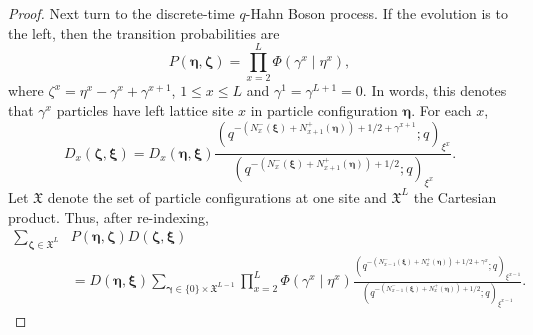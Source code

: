 \documentclass{ximera}
\begin{document}
\begin{proof}
Next turn to the discrete-time $q$-Hahn Boson process.
If the evolution is to the left, then the transition probabilities are
\begin{equation*}
    P(\boldsymbol\eta,\boldsymbol\zeta)=\prod_{x=2}^L\Phi(\gamma^x\mid\eta^x),
\end{equation*}
where $\zeta^x=\eta^x-\gamma^x+\gamma^{x+1}$, $1\le x\le L$ and $\gamma^1=\gamma^{L+1}=0$. In words, this denotes  that $\gamma^x$ particles have left lattice site $x$ in particle configuration $\boldsymbol\eta$.
For each $x$,
\begin{equation*}
   D_x (\boldsymbol\zeta,\boldsymbol\xi)=D_x(\boldsymbol\eta,\boldsymbol\xi)\frac{\left(q^{-\left(N_{x}^-(\boldsymbol\xi)+N_{x+1}^+(\boldsymbol\eta)\right)+1/2+\gamma^{x+1}};q\right)_{\xi^x}}{\left(q^{-\left(N_{x}^-(\boldsymbol\xi)+N_{x+1}^+(\boldsymbol\eta)\right)+1/2};q\right)_{\xi^x}}.
\end{equation*}
Let $\mathfrak{X}$ denote the set of particle configurations at one site and  $\mathfrak{X}^L$ the Cartesian product.
Thus, after re-indexing,
\begin{align*}        \sum_{\boldsymbol\zeta\in\mathfrak{X}^L}&P(\boldsymbol\eta,\boldsymbol\zeta) D(\boldsymbol\zeta,\boldsymbol\xi) \\ & =D(\boldsymbol\eta,\boldsymbol\xi)\sum_{\boldsymbol\gamma\in \{0\}\times \mathfrak{X}^{L-1} }\prod_{x=2}^L\Phi(\gamma^x\mid\eta^x)\frac{\left(q^{-\left(N_{x-1}^-(\boldsymbol\xi)+N_{x}^+(\boldsymbol\eta)\right)+1/2+\gamma^{x}};q\right)_{\xi^{x-1}}}{\left(q^{-\left(N_{x-1}^-(\boldsymbol\xi)+N_{x}^+(\boldsymbol\eta)\right)+1/2};q\right)_{\xi^{x-1}}}.
\end{align*}


\end{proof}
\end{document}
